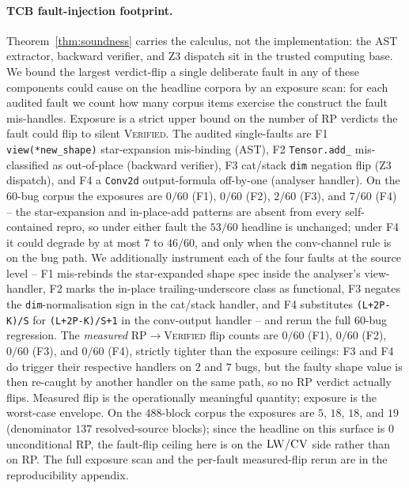 \paragraph{TCB fault-injection footprint.}
Theorem~\ref{thm:soundness} carries the calculus, not the
implementation: the AST extractor, backward verifier, and Z3
dispatch sit in the trusted computing base. We bound the largest
verdict-flip a single deliberate fault in any of these components
could cause on the headline corpora by an exposure scan: for each
audited fault we count how many corpus items exercise the
construct the fault mis-handles. Exposure is a strict upper bound
on the number of RP verdicts the fault could flip to silent
\textsc{Verified}. The audited single-faults are
F1 \texttt{view(*new\_shape)} star-expansion mis-binding (AST),
F2 \texttt{Tensor.add\_} mis-classified as out-of-place (backward
verifier), F3 cat/stack \texttt{dim} negation flip (Z3 dispatch),
and F4 a \texttt{Conv2d} output-formula off-by-one (analyser
handler). On the $60$-bug corpus the exposures are
$0/60$ (F1), $0/60$ (F2), $2/60$ (F3), and $7/60$ (F4) -- the
star-expansion and in-place-add patterns are absent from every
self-contained repro, so under either fault the $53/60$ headline
is unchanged; under F4 it could degrade by at most $7$ to
$46/60$, and only when the conv-channel rule is on the bug path.
We additionally instrument each of the four faults at the source
level -- F1 mis-rebinds the star-expanded shape spec inside the
analyser's view-handler, F2 marks the in-place trailing-underscore
class as functional, F3 negates the \texttt{dim}-normalisation
sign in the cat/stack handler, and F4 substitutes
\texttt{(L+2P-K)/S} for \texttt{(L+2P-K)/S+1} in the conv-output
handler -- and rerun the full $60$-bug regression.  The
\emph{measured} RP$\!\to\!$\textsc{Verified} flip counts are
$0/60$ (F1), $0/60$ (F2), $0/60$ (F3), and $0/60$ (F4),
strictly tighter than the exposure ceilings: F3 and F4 do
trigger their respective handlers on $2$ and $7$ bugs, but the
faulty shape value is then re-caught by another handler on the
same path, so no RP verdict actually flips.  Measured flip is
the operationally meaningful quantity; exposure is the
worst-case envelope.
On the $488$-block corpus the exposures are $5$, $18$, $18$, and
$19$ (denominator $137$ resolved-source blocks); since the
headline on this surface is $0$ unconditional RP, the
fault-flip ceiling here is on the $\textsc{LW}/\textsc{CV}$ side
rather than on RP. The full exposure scan and the per-fault
measured-flip rerun are in the reproducibility appendix.

